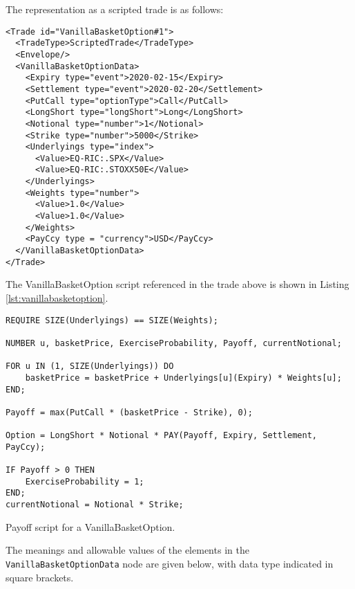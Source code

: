 The representation as a scripted trade is as follows:

\begin{verbatim}
<Trade id="VanillaBasketOption#1">
  <TradeType>ScriptedTrade</TradeType>
  <Envelope/>
  <VanillaBasketOptionData>
    <Expiry type="event">2020-02-15</Expiry>
    <Settlement type="event">2020-02-20</Settlement>
    <PutCall type="optionType">Call</PutCall>
    <LongShort type="longShort">Long</LongShort>
    <Notional type="number">1</Notional>
    <Strike type="number">5000</Strike>
    <Underlyings type="index">
      <Value>EQ-RIC:.SPX</Value>
      <Value>EQ-RIC:.STOXX50E</Value>
    </Underlyings>
    <Weights type="number">
      <Value>1.0</Value>
      <Value>1.0</Value>
    </Weights>
    <PayCcy type = "currency">USD</PayCcy>
  </VanillaBasketOptionData>
</Trade>
\end{verbatim}

The VanillaBasketOption script referenced in the trade above is
shown in Listing \ref{lst:vanillabasketoption}.

\begin{listing}[hbt]
\begin{verbatim}
REQUIRE SIZE(Underlyings) == SIZE(Weights);

NUMBER u, basketPrice, ExerciseProbability, Payoff, currentNotional;

FOR u IN (1, SIZE(Underlyings)) DO
    basketPrice = basketPrice + Underlyings[u](Expiry) * Weights[u];
END;

Payoff = max(PutCall * (basketPrice - Strike), 0);

Option = LongShort * Notional * PAY(Payoff, Expiry, Settlement, PayCcy);

IF Payoff > 0 THEN
    ExerciseProbability = 1;
END;
currentNotional = Notional * Strike;
\end{verbatim}
\caption{Payoff script for a VanillaBasketOption.}
\label{lst:vanillabasketoption}
\end{listing}

The meanings and allowable values of the elements in the
\lstinline!VanillaBasketOptionData! node are given below, with data
type indicated in square brackets.

